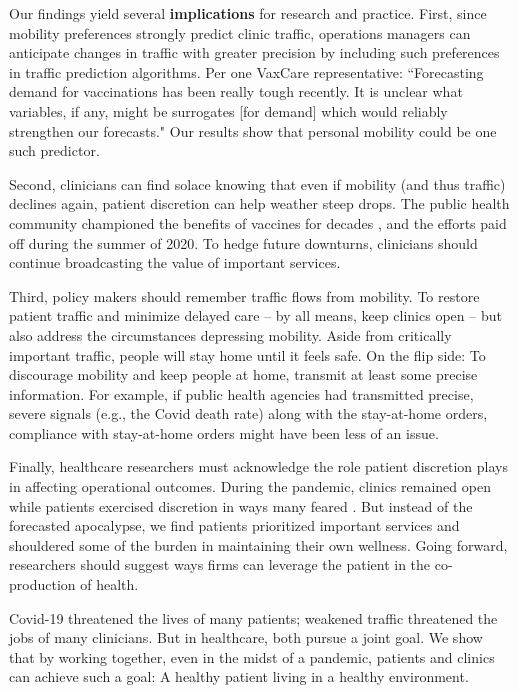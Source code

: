  Our findings yield several \textbf{implications} for research and practice. First, since mobility preferences strongly predict clinic traffic, operations managers can anticipate changes in traffic with greater precision by including such preferences in traffic prediction algorithms. Per one VaxCare representative: “Forecasting demand for vaccinations has been really tough recently. It is unclear what variables, if any, might be surrogates [for demand] which would reliably strengthen our forecasts." Our results show that personal mobility could be one such predictor.
 
 Second, clinicians can find solace knowing that even if mobility (and thus traffic) declines again, patient discretion can help weather steep drops. The public health community championed the benefits of vaccines for decades \citep{Brewer2017}, and the efforts paid off during the summer of 2020. To hedge future downturns, clinicians should continue broadcasting the value of important services.
 
 Third, policy makers should remember traffic flows from mobility. To restore patient traffic and minimize delayed care -- by all means, keep clinics open -- but also address the circumstances depressing mobility. Aside from critically important traffic, people will stay home until it feels safe. On the flip side: To discourage mobility and keep people at home, transmit at least some precise information. For example, if public health agencies had transmitted precise, severe signals (e.g., the Covid death rate) along with the stay-at-home orders, compliance with stay-at-home orders might have been less of an issue. 
 
 Finally, healthcare researchers must acknowledge the role patient discretion plays in affecting operational outcomes. During the pandemic, clinics remained open while patients exercised discretion in ways many feared \citep{WSJ_famVacc}. But instead of the forecasted apocalypse, we find patients prioritized important services and shouldered some of the burden in maintaining their own wellness. Going forward, researchers should suggest ways firms can leverage the patient in the co-production of health.
 
 Covid-19 threatened the lives of many patients; weakened traffic threatened the jobs of many clinicians. But in healthcare, both pursue a joint goal. We show that by working together, even in the midst of a pandemic, patients and clinics can achieve such a goal: A healthy patient living in a healthy environment.

